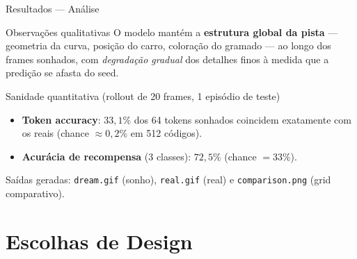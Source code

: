 \documentclass[11pt,aspectratio=169]{beamer}
\begin{document}
\begin{frame}{Resultados --- Análise}
  \begin{block}{Observações qualitativas}
    O modelo mantém a \textbf{estrutura global da pista} --- geometria da curva,
    posição do carro, coloração do gramado --- ao longo dos frames sonhados,
    com \emph{degradação gradual} dos detalhes finos à medida que a predição
    se afasta do seed.
  \end{block}

  \bigskip
  \begin{block}{Sanidade quantitativa (rollout de 20 frames, 1 episódio de teste)}
    \begin{itemize}\small
      \item \textbf{Token accuracy}: $33{,}1\%$ dos 64 tokens sonhados
            coincidem exatamente com os reais (chance $\approx 0{,}2\%$
            em 512 códigos).
      \item \textbf{Acurácia de recompensa} (3 classes): $72{,}5\%$
            (chance $= 33\%$).
    \end{itemize}
  \end{block}

  \bigskip
  \small Saídas geradas: \texttt{dream.gif} (sonho), \texttt{real.gif} (real)
  e \texttt{comparison.png} (grid comparativo).
\end{frame}

\section{Escolhas de Design}
\end{document}
